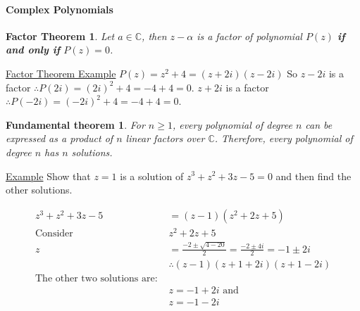 \documentclass[a4paper]{article}
\begin{document}
				\paragraph{Complex Polynomials}
					\newtheorem*{factorTheorem*}{Factor Theorem}
					\newtheorem*{polynomialTheorem*}{Fundamental theorem}
					\begin{factorTheorem*}
						Let $a\in\mathbb{C}$, then $z-\alpha$ is a factor of polynomial $P(z)$ \textbf{if and only if} $P(z)=0$.
					\end{factorTheorem*}
					\noindent\underline{Factor Theorem Example}\newline
					$P(z)=z^2+4=(z+2i)(z-2i)$ \newline
					So $z-2i$ is a factor $\therefore P(2i)=(2i)^2+4=-4+4=0$. \newline
					$z+2i$ is a factor $\therefore P(-2i)=(-2i)^2+4=-4+4=0$.
					\newline
					\begin{polynomialTheorem*}
						For $n\geq1$, every polynomial of degree $n$ can be expressed as a product of $n$ linear factors over $\mathbb{C}$. Therefore, every polynomial of degree $n$ has $n$ solutions.
					\end{polynomialTheorem*}
					\noindent\underline{Example}\newline
					Show that $z=1$ is a solution of $z^3+z^2+3z-5=0$ and then find the other solutions.\newline
					\begin{minipage}[t]{0.5\textwidth}
						\vspace{0pt}
					\end{minipage}
					\hfill
					\begin{minipage}[t]{0.5\textwidth}
						\vspace{0pt}
						\begin{align*}
							z^3+z^2+3z-5&=(z-1)(z^2+2z+5) \\
							\text{Consider }&z^2+2z+5 \\
							z&=\frac{-2\pm\sqrt{4-20}}{2}=\frac{-2\pm4i}{2}=-1\pm2i \\
							&\therefore(z-1)(z+1+2i)(z+1-2i) \\
							\text{The other two solutions are: } \\
							&z=-1+2i\text{ and } \\
							&z=-1-2i
						\end{align*}
					\end{minipage}
\end{document}
